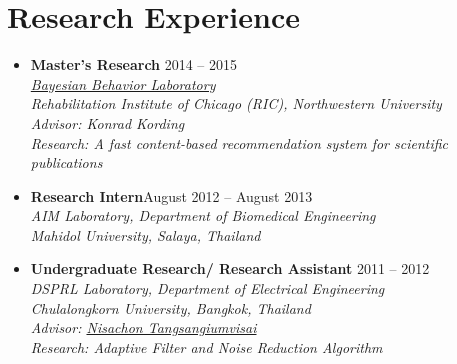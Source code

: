 \section{\sc Research Experience}

\begin{itemize}[leftmargin=0cm, label={}]

\item {\bf Master's Research} \hfill{2014 -- 2015}\\
{\em \href{http://klab.smpp.northwestern.edu/wiki/index.php5/Main_Page}{Bayesian Behavior Laboratory}\\
Rehabilitation Institute of Chicago (RIC), Northwestern University \\
Advisor: Konrad Kording \\
Research: A fast content-based recommendation system for scientific publications}

\item {\bf Research Intern}\hfill{August 2012 -- August 2013}\\
{\em AIM Laboratory, Department of Biomedical Engineering\\
Mahidol University, Salaya, Thailand}

\item {\bf Undergraduate Research/ Research Assistant}		\hfill{2011 -- 2012}\\
{\em DSPRL Laboratory, Department of Electrical Engineering\\
Chulalongkorn University, Bangkok, Thailand\\
Advisor: \href{http://nisachon.lecturer.eng.chula.ac.th}{Nisachon Tangsangiumvisai}\\
Research: Adaptive Filter and Noise Reduction Algorithm}

\end{itemize}
